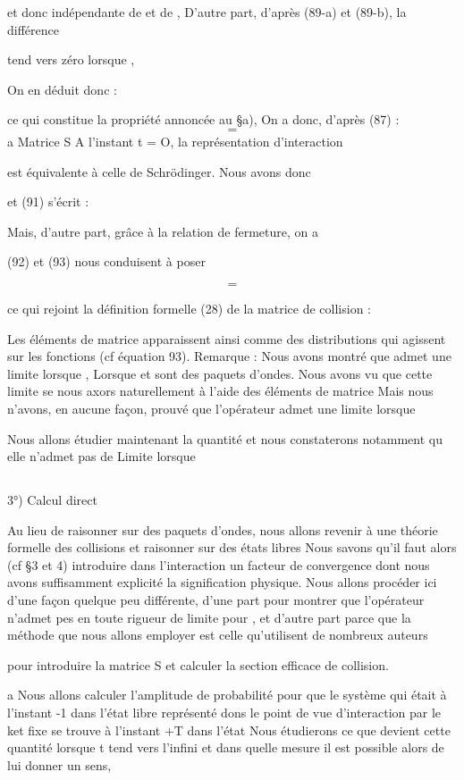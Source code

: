 et donc indépendante de  et de ,
D'autre part, d'après (89-a) et (89-b), la différence

tend vers zéro lorsque ,

On en déduit donc :

ce qui constitue la propriété annoncée au \S a),
On a donc, d'après (87) :
\[
\tag{91}=
\]
a Matrice S
A l'instant t = O, la représentation d'interaction

est équivalente à celle de Schrödinger. Nous avons donc

et (91) s'écrit :

Mais, d'autre part, grâce à la relation de fermeture, on a


(92) et (93) nous conduisent à poser

\[
\tag{94}=
\]

ce qui rejoint la définition formelle (28) de la matrice de collision :

Les éléments de matrice  apparaissent ainsi comme des distributions
qui agissent sur les fonctions (cf équation 93).
Remarque : 
Nous avons montré que  admet une limite lorsque
, Lorsque  et  sont des paquets d'ondes.
Nous avons vu que cette limite se nous axors naturellement à l'aide
des éléments de matrice
Mais nous n'avons, en aucune façon, prouvé que l'opérateur 
admet une limite lorsque 

Nous allons étudier maintenant la quantité
et nous constaterons notamment qu elle n'admet pas de Limite lorsque

\subsection{}%
3°) Calcul direct 

Au lieu de raisonner sur des paquets d'ondes, nous allons revenir
à une théorie formelle des collisions et raisonner sur des états libres
Nous savons qu'il faut alors (cf \S 3 et 4) introduire dans l'interaction un
facteur de convergence dont nous avons suffisamment explicité la signification
physique. Nous allons procéder ici d'une façon quelque peu différente,
d'une part pour montrer que l'opérateur  n'admet pes en toute rigueur de limite
pour , et d'autre part parce que la
méthode que nous allons employer est celle qu'utilisent de nombreux auteurs

pour introduire la matrice S et calculer la section efficace de collision.


a Nous allons calculer l'amplitude de probabilité
 pour que le système qui était à l'instant -1 dans l'état libre représenté dons
 le point de vue d'interaction par le ket fixe  se trouve à l'instant +T dans
l'état Nous étudierons ce que devient cette quantité lorsque t tend vers
l'infini et dans quelle mesure il est possible alors
de lui donner un sens,


